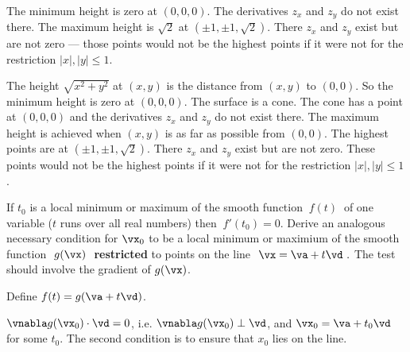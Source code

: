 \begin{answer}
The minimum height is zero at $(0,0,0)$. The derivatives 
$z_x$ and $z_y$ do not exist there. 
The maximum height is $\sqrt{2}$ at $(\pm 1,\pm 1,\sqrt{2})$. 
There $z_x$ and $z_y$ exist but are not zero --- those points would 
not be the highest points if it were not for the restriction 
$|x|,|y|\le 1$.
\end{answer}

\begin{solution}
The height $\sqrt{x^2+y^2}$ at $(x,y)$ is the distance from $(x,y)$
to $(0,0)$. So the minimum height is zero at $(0,0,0)$. The surface is a 
cone. The cone has a point at $(0,0,0)$ and the derivatives 
$z_x$ and $z_y$ do not exist there. 
The maximum height is achieved when $(x,y)$ is as far as possible from
$(0,0)$. The highest points are at $(\pm 1,\pm 1,\sqrt{2})$. There 
$z_x$ and $z_y$ exist but are not zero. These points would not 
be the highest points if it were not for the restriction $|x|,|y|\le 1$.
\end{solution}

\begin{question}
If $t_0$ is a local minimum or maximum of the smooth function $\ f(t)\ $
of one variable ($t$ runs over all real numbers) then $\ f'(t_0)=0.$
Derive an analogous necessary condition for $\vx_0$ to be a local minimum
or maximium of the smooth function $\ g(\vx)\ $ \textbf{restricted} to points on
the line $\ \vx=\va+t\vd\ .$ The test should involve the gradient 
of $g(\vx)$. 

\end{question}

\begin{hint}
Define $f(t)=g(\va+t\vd)$.
\end{hint}

\begin{answer}
$\vnabla g(\vx_0)\cdot\vd=0$, i.e. $\vnabla g(\vx_0)\perp\vd$, and $\vx_0=\va+t_0\vd$ for some $t_0$. 
The second condition is to ensure that $x_0$ lies on the line.
\end{answer}

